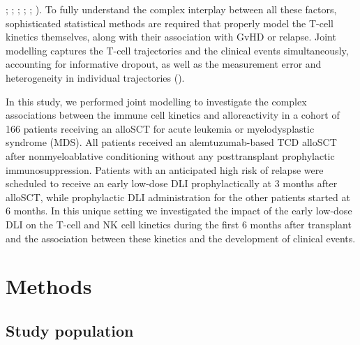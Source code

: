 \documentclass[
  letterpaper,
  paper=240mm:170mm,
  twoside=true,
  open=right,
  fontsize=10pt,
  pagesize=false,
  BCOR=15mm,
  DIV=14,
  headinclude=true,
  footinclude=false,
  headsepline=on]{scrbook}
\begin{document}
;
; ;
;
;
). To fully understand the complex interplay between all these
factors, sophisticated statistical methods are required that properly
model the T-cell kinetics themselves, along with their association with
GvHD or relapse. Joint modelling captures the T-cell trajectories and
the clinical events simultaneously, accounting for informative dropout,
as well as the measurement error and heterogeneity in individual
trajectories
().

In this study, we performed joint modelling to investigate the complex
associations between the immune cell kinetics and alloreactivity in a
cohort of 166 patients receiving an alloSCT for acute leukemia or
myelodysplastic syndrome (MDS). All patients received an
alemtuzumab-based TCD alloSCT after nonmyeloablative conditioning
without any posttransplant prophylactic immunosuppression. Patients with
an anticipated high risk of relapse were scheduled to receive an early
low-dose DLI prophylactically at 3 months after alloSCT, while
prophylactic DLI administration for the other patients started at 6
months. In this unique setting we investigated the impact of the early
low-dose DLI on the T-cell and NK cell kinetics during the first 6
months after transplant and the association between these kinetics and
the development of clinical events.

\section{Methods}\label{methods-2}

\subsection{Study population}\label{study-population}
\end{document}
